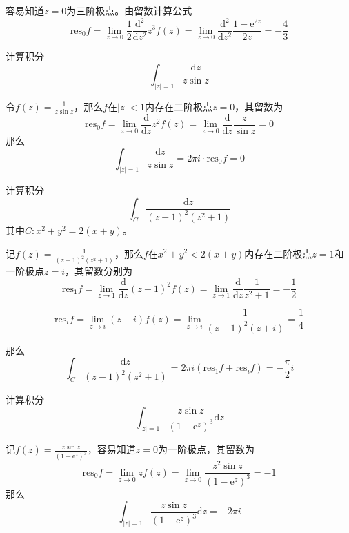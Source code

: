 \documentclass[lang = cn, scheme = chinese, thmcnt = section]{elegantbook}
\begin{document}
\begin{solution}
	容易知道$z=0$​为三阶极点。由留数计算公式
	$$
	\mathrm{res}_{0}f=\lim_{z\to 0}\frac{1}{2}\frac{\mathrm{d}^{2}}{\mathrm{d}z^{2}}z^3f(z)=\lim_{z\to 0}\frac{\mathrm{d}^{2}}{\mathrm{d}z^{2}}\frac{1-\mathrm{e}^{2z}}{2z}=-\frac{4}{3}
	$$
\end{solution}

\begin{example}
	计算积分
	$$
	\int_{|z|=1}\frac{\mathrm{d}z}{z\sin{z}}
	$$
\end{example}

\begin{solution}
	令$f(z)=\frac{1}{z\sin z}$，那么$f$在$|z|<1$内存在二阶极点$z=0$​，其留数为
	$$
	\mathrm{res}_{0}f=\lim_{z\to 0}\frac{\mathrm{d}}{\mathrm{d}z}z^2f(z)=\lim_{z\to 0}\frac{\mathrm{d}}{\mathrm{d}z}\frac{z}{\sin z}=0
	$$
	那么
	$$
	\int_{|z|=1}\frac{\mathrm{d}z}{z\sin{z}}=2\pi i\cdot\mathrm{res}_{0}f=0
	$$
\end{solution}

\begin{example}
	计算积分%
	$$
	\int_{C}\frac{\mathrm{d}z}{(z-1)^2(z^2+1)}
	$$
	其中$C:x^2+y^2=2(x+y)$。
\end{example}

\begin{solution}
	记$f(z)=\frac{1}{(z-1)^2(z^2+1)}$，那么$f$在$x^2+y^2<2(x+y)$内存在二阶极点$z=1$和一阶极点$z=i$，其留数分别为
	$$
	\mathrm{res}_{1}f=\lim_{z\to 1}\frac{\mathrm{d}}{\mathrm{d}z}(z-1)^2f(z)=\lim_{z\to 1}\frac{\mathrm{d}}{\mathrm{d}z}\frac{1}{z^2+1}=-\frac{1}{2}
	$$
	
	$$
	\mathrm{res}_{i}f=\lim_{z\to i}(z-i)f(z)=\lim_{z\to i}\frac{1}{(z-1)^2(z+i)}=\frac{1}{4}
	$$
	
	那么
	$$
	\int_{C}\frac{\mathrm{d}z}{(z-1)^2(z^2+1)}=2\pi i(\mathrm{res}_{1}f+\mathrm{res}_{i}f)=-\frac{\pi}{2}i
	$$
\end{solution}

\begin{example}
	计算积分%
	$$
	\int_{|z|=1}\frac{z\sin{z}}{(1-\mathrm{e}^{z})^3}\mathrm{d}z
	$$
\end{example}

\begin{solution}
	记$f(z)=\frac{z\sin{z}}{(1-\mathrm{e}^{z})^3}$，容易知道$z=0$为一阶极点，其留数为
	$$
	\mathrm{res}_{0}f=\lim_{z\to 0}zf(z)=\lim_{z\to 0}\frac{z^2\sin{z}}{(1-\mathrm{e}^{z})^3}=-1
	$$
	那么
	$$
	\int_{|z|=1}\frac{z\sin{z}}{(1-\mathrm{e}^{z})^3}\mathrm{d}z=-2\pi i
	$$
\end{solution}
\end{document}
